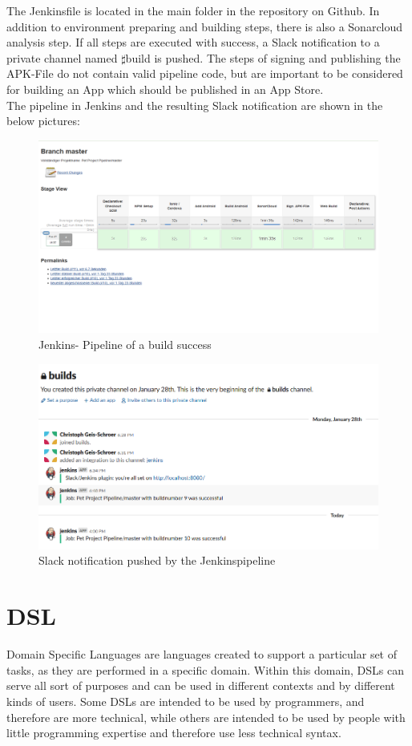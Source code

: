 \documentclass[12pt]{article}
\begin{document}
The Jenkinsfile is located in the main folder in the repository on Github. In addition to environment preparing and building steps, there is also a Sonarcloud analysis step. If all steps are executed with success, a Slack notification to a private channel named $ \sharp$build is pushed. The steps of signing and publishing the APK-File do not contain valid pipeline code, but are important to be considered for building an App which should be published in an App Store.\\
The pipeline in Jenkins and the resulting Slack notification are shown in the below pictures:
\begin{figure}[H]
 \includegraphics[width=\linewidth]{figures/Jenkins_Pipeline.PNG}
 \caption{Jenkins- Pipeline of a build success}\label{fig:awesome_image7}
\end{figure}
\begin{figure}[H]
 \includegraphics[width=\linewidth]{figures/Slack_Notification.PNG}
 \caption{Slack notification pushed by the Jenkinspipeline}\label{fig:awesome_image8}
\end{figure}

\section{DSL}
Domain Specific Languages are languages created to support a particular set of tasks, as they are performed in a specific domain.
Within this domain, DSLs can serve all sort of purposes and can be used in different contexts and by different kinds of users. Some DSLs are intended to be used by programmers, and therefore are more technical, while others are intended to be used by people with little programming expertise and therefore use less technical syntax.
\end{document}
